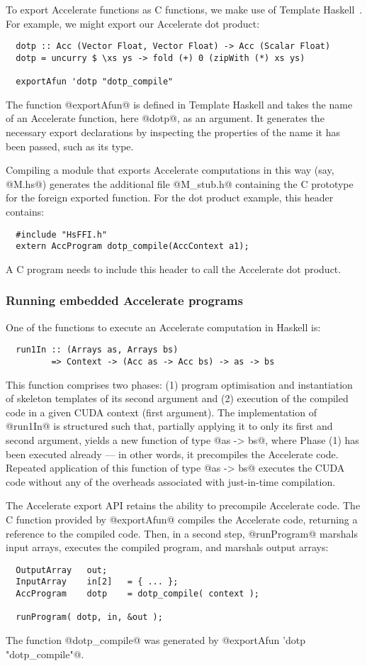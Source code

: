 To export Accelerate functions as C functions, we make use of Template Haskell~\cite{Sheard:2002template}. For example, we might export our Accelerate dot product:
%
\begin{lstlisting}
  dotp :: Acc (Vector Float, Vector Float) -> Acc (Scalar Float)
  dotp = uncurry $ \xs ys -> fold (+) 0 (zipWith (*) xs ys)

  exportAfun 'dotp "dotp_compile"
\end{lstlisting}%
%
The function @exportAfun@ is defined in Template Haskell and takes the name of an Accelerate function, here @dotp@, as an argument. It generates the necessary export declarations by inspecting the properties of the name it has been passed, such as its type.

Compiling a module that exports Accelerate computations in this way (say,
@M.hs@) generates the additional file @M_stub.h@ containing the C prototype for
the foreign exported function. For the dot product example, this header contains:
%
\begin{lstlisting}
  #include "HsFFI.h"
  extern AccProgram dotp_compile(AccContext a1);
\end{lstlisting}%
%
A C program needs to include this header to call the Accelerate dot product.


\subsubsection{Running embedded Accelerate programs}

One of the functions to execute an Accelerate computation in Haskell is:
%
\begin{lstlisting}
  run1In :: (Arrays as, Arrays bs)
         => Context -> (Acc as -> Acc bs) -> as -> bs
\end{lstlisting}%
%
This function comprises two phases: (1) program optimisation and instantiation of skeleton templates of its second argument and (2) execution of the compiled code in a given CUDA context (first argument). The implementation of @run1In@ is structured such that, partially applying it to only its first and second argument, yields a new function of type @as -> bs@, where Phase (1) has been executed already --- in other words, it precompiles the Accelerate code. Repeated application of this function of type @as -> bs@ executes the CUDA code without any of the overheads associated with just-in-time compilation.

The Accelerate export API retains the ability to precompile Accelerate code. The C function provided by @exportAfun@ compiles the Accelerate code, returning a reference to the compiled code. Then, in a second step, @runProgram@ marshals input arrays, executes the compiled program, and marshals output arrays:
%
\begin{lstlisting}
  OutputArray   out;
  InputArray    in[2]   = { ... };
  AccProgram    dotp    = dotp_compile( context );

  runProgram( dotp, in, &out );
\end{lstlisting}%
%
The function @dotp_compile@ was generated by @exportAfun 'dotp "dotp_compile"@.

